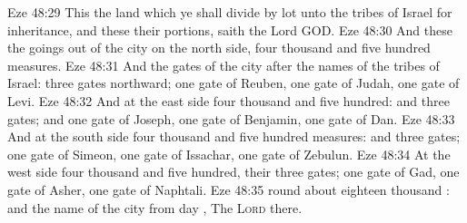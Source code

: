 \vs Eze 48:29 This  the land which ye shall divide by lot unto the tribes of Israel for inheritance, and these  their portions, saith the Lord GOD.
\vs Eze 48:30 And these  the goings out of the city on the north side, four thousand and five hundred measures.
\vs Eze 48:31 And the gates of the city  after the names of the tribes of Israel: three gates northward; one gate of Reuben, one gate of Judah, one gate of Levi.
\vs Eze 48:32 And at the east side four thousand and five hundred: and three gates; and one gate of Joseph, one gate of Benjamin, one gate of Dan.
\vs Eze 48:33 And at the south side four thousand and five hundred measures: and three gates; one gate of Simeon, one gate of Issachar, one gate of Zebulun.
\vs Eze 48:34 At the west side four thousand and five hundred,  their three gates; one gate of Gad, one gate of Asher, one gate of Naphtali.
\vs Eze 48:35  round about eighteen thousand : and the name of the city from  day , The \textsc{Lord}  there.
